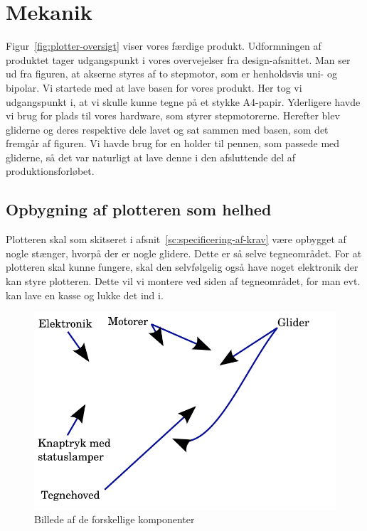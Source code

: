 \chapter[Implementering af mekanik]{Mekanik}


Figur~\vref{fig:plotter-oversigt} viser vores færdige produkt.
Udformningen af produktet tager udgangspunkt i vores overvejelser fra
design-afsnittet.  Man ser ud fra figuren, at akserne styres af to
stepmotor, som er henholdsvis uni- og bipolar.  Vi startede med at
lave basen for vores produkt. Her tog vi udgangspunkt i, at vi skulle
kunne tegne på et stykke A4-papir. Yderligere havde vi brug for plads
til vores hardware, som styrer stepmotorerne. Herefter blev gliderne
og deres respektive dele lavet og sat sammen med basen, som det
fremgår af figuren. Vi havde brug for en holder til pennen, som
passede med gliderne, så det var naturligt at lave denne i den
afsluttende del af produktionsforløbet.

\section{Opbygning af plotteren som helhed}
Plotteren skal som skitseret i afsnit~\vref{sc:specificering-af-krav}
være opbygget af nogle stænger, hvorpå der er nogle glidere. Dette er
så selve tegneområdet. For at plotteren skal kunne fungere, skal den
selvfølgelig også have noget elektronik der kan styre plotteren. Dette
vil vi montere ved siden af tegneområdet, for man evt. kan lave en
kasse og lukke det ind i.


\begin{figure}[htbp]
  \centering
  \includegraphics[width=\textwidth]{./img/plotter-oversigt}
  \caption{Billede af de forskellige komponenter}
  \label{fig:plotter-oversigt}
\end{figure}

